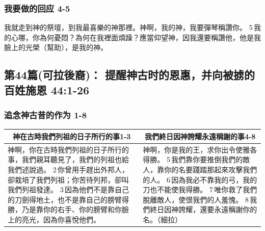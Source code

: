 \subsubsection{我要做的回应 4-5}
我就走到神的祭壇，到我最喜樂的神那裡。神啊，我的神，我要彈琴稱讚你。
5 我的心哪，你為何憂悶？為何在我裡面煩躁？應當仰望神，因我還要稱讚他，他是我臉上的光榮（幫助），是我的神。

\subsection{第44篇(可拉後裔)： 提醒神古时的恩惠，并向被掳的百姓施恩 44:1-26}
\subsubsection{追念神古昔的作为 1-8}
\begin{table}[H]
\centering
\begin{tabular}{p{9.25cm}|p{8.50cm}}\hline\hline
\multicolumn{1}{c|}{神在古時我們列祖的日子所行的事1-3}&\multicolumn{1}{c}{我們終日因神誇耀永遠稱謝的事4-8}\\\hline
神啊，你在古時我們列祖的日子所行的事，我們親耳聽見了，我們的列祖也給我們述說過。
2 你曾用手趕出外邦人，卻栽培了我們列祖；你苦待列邦，卻叫我們列祖發達。
3 因為他們不是靠自己的刀劍得地土，也不是靠自己的膀臂得勝，乃是靠你的右手、你的膀臂和你臉上的亮光，因為你喜悅他們。
&神啊，你是我的王，求你出令使雅各得勝。
5 我們靠你要推倒我們的敵人，靠你的名要踐踏那起來攻擊我們的人。
6 因為我必不靠我的弓，我的刀也不能使我得勝。
7 唯你救了我們脫離敵人，使恨我們的人羞愧。
8 我們終日因神誇耀，還要永遠稱謝你的名。（細拉）\\\hline
\end{tabular}
\end{table} 

